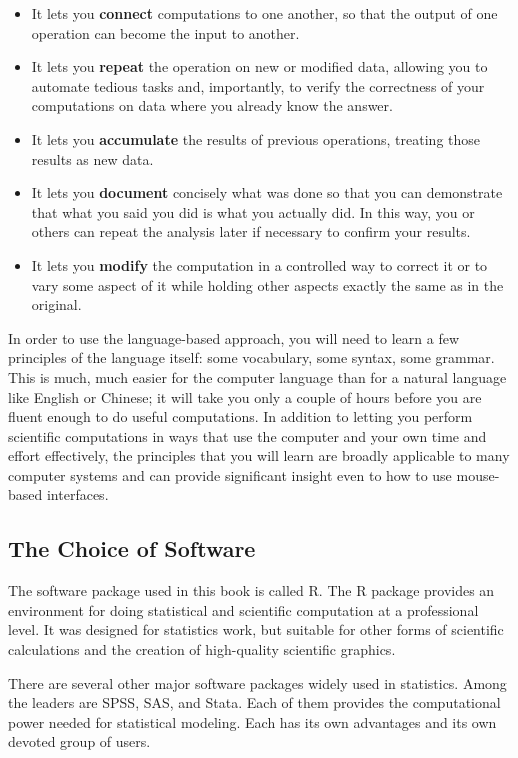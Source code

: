 \begin{itemize}
\item It lets you {\bf connect} computations to one another, so that the
  output of one operation can become the input to another.
\item It lets you {\bf repeat} the operation on new or modified data,
  allowing you to automate tedious tasks and, importantly, to verify
  the correctness of your computations on data where you already know
  the answer.
\item It lets you {\bf accumulate} the results of previous operations,
  treating those results as new data.
\item It lets you {\bf document} concisely what was done so that you can
  demonstrate that what you said you did is what you actually did. 
  In this way, you or others can repeat the analysis 
  later if necessary to confirm your results.
\item It lets you {\bf modify} the computation in a controlled way
  to correct it or to vary some aspect of it while holding other
  aspects exactly the same as in the original.
\end{itemize}

In order to use the language-based approach, you will need to learn a
few principles of the language itself: some vocabulary, some syntax,
some grammar.  This is much, much easier for the computer language
than for a natural language like English or Chinese; it will take you
only a couple of hours before you are fluent enough to do useful
computations.  In addition to letting you perform scientific
computations in ways that use the computer and your own time and
effort effectively, the principles that you will learn are broadly
applicable to many computer systems and can provide significant
insight even to how to use mouse-based interfaces.

\subsection{The Choice of Software}

The software package used in this book is called R.  The R
package provides an environment for doing statistical and scientific
computation at a professional level. It was designed for statistics
work, but suitable for other forms of scientific calculations and the
creation of high-quality scientific graphics.\cite{R-software}

There are several other major software packages widely used in statistics.
Among the leaders are SPSS, SAS, and Stata.  Each of them provides
the computational power needed for statistical modeling.
Each has its own advantages and its own devoted group of users. 

